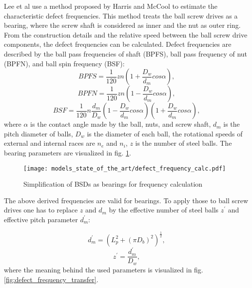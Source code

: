 Lee et al use a method proposed by Harris and McCool \cite{Harris1996} to estimate the characteristic defect frequencies. This method treats the ball screw drives as a bearing, where the screw shaft is considered as inner and the nut as outer ring. From the construction details and the relative speed between the ball screw drive components, the defect frequencies can be calculated. 
Defect frequencies are described by the ball pass frequencies of shaft (BPFS), ball pass frequency of nut (BPFN), and ball spin frequency (BSF): 
\begin{equation}
    BPFS = \frac{1}{120}zn(1+\frac{D_{w}}{d_{m}}cos\alpha),
    \label{eq:defect_frequency}
\end{equation}
\begin{equation}
    BPFN = \frac{1}{120}zn(1-\frac{D_{w}}{d_{m}}cos\alpha),
\end{equation}
\begin{equation}
    BSF = \frac{1}{120}n\frac{d_{m}}{D_{w}} (1-\frac{D_{w}}{d_{m}}cos\alpha)(1+\frac{D_{w}}{d_{m}}cos\alpha) ,
\end{equation}
where $\alpha$ is the contact angle made by the ball, nuts, and screw shaft, $d_{m}$ is the pitch diameter of balls, $D_{w}$ is the diameter of each ball, the rotational speeds of external and internal races are $n_{e}$ and $n_{i}$, $z$ is the number of steel balls. The bearing parameters are visualized in fig. \ref{fig:defect_frequency_calc}. 

\begin{figure}[H]
  \centering
  \texttt{[image: models\_state\_of\_the\_art/defect\_frequency\_calc.pdf]}
  \caption{Simplification of BSDs as bearings for frequency calculation \cite{Lee2015}}
  \label{fig:defect_frequency_calc}
\end{figure}

The above derived frequencies are valid for bearings. To apply those to ball screw drives one has to replace $z$ and $d_{m}$ by the effective number of steel balls $z^{'}$ and effective pitch parameter $d_{m}^{'}$:

\begin{equation}
    d_{m}^{'} = (L_{p}^{2}+(\pi D_{b})^{2})^{\frac{1}{2}},
\end{equation}
\begin{equation}
    z^{'} = \frac{d_{m}^{'}}{D_{w}},
\end{equation}
where the meaning behind the used parameters is visualized in fig. \ref{fig:defect_frequency_transfer}. 

